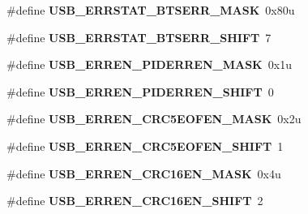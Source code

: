 \begin{DoxyCompactItemize}
\item 
\hypertarget{group___u_s_b___register___masks_ga9cfa1a07c56005e5d545ecf363c4e916}{}\#define {\bfseries U\+S\+B\+\_\+\+E\+R\+R\+S\+T\+A\+T\+\_\+\+B\+T\+S\+E\+R\+R\+\_\+\+M\+A\+S\+K}~0x80u\label{group___u_s_b___register___masks_ga9cfa1a07c56005e5d545ecf363c4e916}

\item 
\hypertarget{group___u_s_b___register___masks_ga4827905bfe176b3ba2992ce3ff9a4575}{}\#define {\bfseries U\+S\+B\+\_\+\+E\+R\+R\+S\+T\+A\+T\+\_\+\+B\+T\+S\+E\+R\+R\+\_\+\+S\+H\+I\+F\+T}~7\label{group___u_s_b___register___masks_ga4827905bfe176b3ba2992ce3ff9a4575}

\item 
\hypertarget{group___u_s_b___register___masks_ga971e0d8939196ec3990a73b4db4030ad}{}\#define {\bfseries U\+S\+B\+\_\+\+E\+R\+R\+E\+N\+\_\+\+P\+I\+D\+E\+R\+R\+E\+N\+\_\+\+M\+A\+S\+K}~0x1u\label{group___u_s_b___register___masks_ga971e0d8939196ec3990a73b4db4030ad}

\item 
\hypertarget{group___u_s_b___register___masks_ga47a2a895b1b94a32aa482d11173e2fb9}{}\#define {\bfseries U\+S\+B\+\_\+\+E\+R\+R\+E\+N\+\_\+\+P\+I\+D\+E\+R\+R\+E\+N\+\_\+\+S\+H\+I\+F\+T}~0\label{group___u_s_b___register___masks_ga47a2a895b1b94a32aa482d11173e2fb9}

\item 
\hypertarget{group___u_s_b___register___masks_gafab72bb1aedf0d529c720a25d6ee93da}{}\#define {\bfseries U\+S\+B\+\_\+\+E\+R\+R\+E\+N\+\_\+\+C\+R\+C5\+E\+O\+F\+E\+N\+\_\+\+M\+A\+S\+K}~0x2u\label{group___u_s_b___register___masks_gafab72bb1aedf0d529c720a25d6ee93da}

\item 
\hypertarget{group___u_s_b___register___masks_gafc8288624f2373be283f408a290f3daf}{}\#define {\bfseries U\+S\+B\+\_\+\+E\+R\+R\+E\+N\+\_\+\+C\+R\+C5\+E\+O\+F\+E\+N\+\_\+\+S\+H\+I\+F\+T}~1\label{group___u_s_b___register___masks_gafc8288624f2373be283f408a290f3daf}

\item 
\hypertarget{group___u_s_b___register___masks_gae216c42729f6b3d992001136744fe341}{}\#define {\bfseries U\+S\+B\+\_\+\+E\+R\+R\+E\+N\+\_\+\+C\+R\+C16\+E\+N\+\_\+\+M\+A\+S\+K}~0x4u\label{group___u_s_b___register___masks_gae216c42729f6b3d992001136744fe341}

\item 
\hypertarget{group___u_s_b___register___masks_ga7d910c7016807387969de45f0ac3e2d6}{}\#define {\bfseries U\+S\+B\+\_\+\+E\+R\+R\+E\+N\+\_\+\+C\+R\+C16\+E\+N\+\_\+\+S\+H\+I\+F\+T}~2\label{group___u_s_b___register___masks_ga7d910c7016807387969de45f0ac3e2d6}


\end{DoxyCompactItemize}
